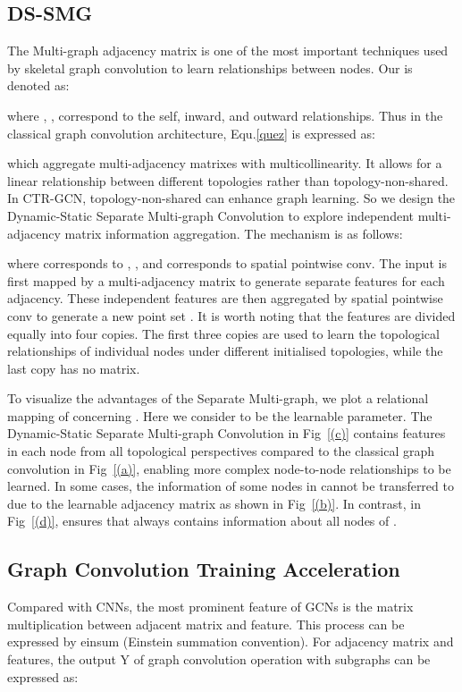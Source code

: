 \documentclass[10pt,twocolumn,letterpaper]{article}
\begin{document}
\subsection{DS-SMG}
\label{ssec:smc}

The Multi-graph adjacency matrix is one of the most important techniques used by skeletal graph convolution to learn relationships between nodes. Our  is denoted as:

where , ,  correspond to the self, inward, and outward relationships. Thus in the classical graph convolution architecture, Equ.\ref{quez} is expressed as:

which aggregate multi-adjacency matrixes with multicollinearity. It allows for a linear relationship between different topologies rather than topology-non-shared. In CTR-GCN, topology-non-shared can enhance graph learning. So we design the Dynamic-Static Separate Multi-graph Convolution to explore independent multi-adjacency matrix information aggregation. The mechanism is as follows:

where  corresponds to , , and  corresponds to spatial pointwise conv. The input  is first mapped by a multi-adjacency matrix to generate separate features for each adjacency. These independent features are then aggregated by spatial pointwise conv to generate a new point set . It is worth noting that the features are divided equally into four copies. The first three copies are used to learn the topological relationships of individual nodes under different initialised topologies, while the last copy  has no matrix.

To visualize the advantages of the Separate Multi-graph, we plot a relational mapping of  concerning . Here we consider  to be the learnable parameter. The Dynamic-Static Separate Multi-graph Convolution in Fig~\ref{(c)} contains features in each node from all topological perspectives compared to the classical graph convolution in Fig~\ref{(a)}, enabling more complex node-to-node relationships to be learned. In some cases, the information of some nodes in  cannot be transferred to  due to the learnable adjacency matrix as shown in Fig~\ref{(b)}. In contrast, in Fig~\ref{(d)},  ensures that  always contains information about all nodes of .



\subsection{Graph Convolution Training Acceleration}
Compared with CNNs, the most prominent feature of GCNs is the matrix multiplication between adjacent matrix and feature. This process can be expressed by einsum (Einstein summation convention). For adjacency matrix and features, the output Y of graph convolution operation with  subgraphs can be expressed as:
\end{document}
